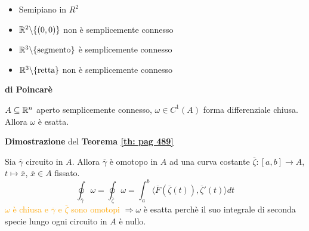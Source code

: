 	
\begin{exbar}
\begin{example}
		\begin{itemize}
			\item Semipiano in $R^2$\\
			
			\segnaposto %
			
			\item $\mathbb{R}^2 \backslash \{(0,0)\}$ non è semplicemente connesso\\
			
			\segnaposto %
			
			\item $\mathbb{R}^3 \backslash \{\text{segmento}\}$ è semplicemente connesso\\
			
			\segnaposto %
			
			\item $\mathbb{R}^3 \backslash \{\text{retta}\}$ non è semplicemente connesso\\
			
			\segnaposto %
		\end{itemize}
\end{example}
\end{exbar}
	
	
\begin{theorem} \textbf{di Poincarè}
	
	\label{th: pag 489}
	$A \subseteq \mathbb{R}^n$ aperto semplicemente connesso, $\omega \in C^1(A)$ forma differenziale chiusa. Allora $\omega$ è esatta. 
\end{theorem}


\begin{dembar}
	\textbf{Dimostrazione} del \textbf{Teorema \ref{th: pag 489}}
	
	Sia $\overline{\gamma}$ circuito in $A$. Allora $\overline{\gamma}$ è omotopo in $A$ ad una curva costante $\overline{\zeta}:[a,b]\rightarrow A$, $t \mapsto \overline{x}$, $\overline{x}\in A$ fissato.
	\begin{equation*}
		\oint_{\overline{\gamma}} \omega = \oint_{\overline{\zeta}} \omega= \int_a^b \langle \overline{F}(\overline{\zeta}(t)), \overline{\zeta}'(t)\rangle dt
	\end{equation*}
	\textcolor{orange}{$\omega$ è chiusa e $\overline{\gamma}$ e $\overline{\zeta}$ sono omotopi}
	$\Rightarrow \omega$ è esatta perchè il suo integrale di seconda specie lungo ogni circuito in $A$ è nullo.
\end{dembar}
	

